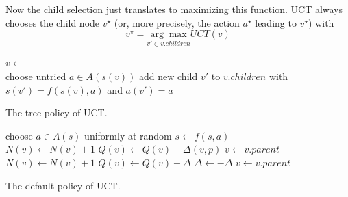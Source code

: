 Now the child selection just translates to maximizing this function. UCT always chooses the child node $v^\star$ (or, more precisely, the action $a^\star$ leading to $v^\star$) with
\begin{equation*}
    v^\star = \underset{v' \in v.children}{\arg \max} UCT(v)
\end{equation*}  
\begin{algorithm}[htbp]
\begin{algorithmic}
    \State {}
    \Else
    \State $v \gets$ 
    \EndIf
    \EndWhile
\EndFunction \\
\State choose untried $a \in A(s(v))$
\State add new child $v'$ to $v.children$ with $s(v') = f(s(v),a)$ and $a(v') = a$
\State {}
\EndFunction \\
\State {}
\EndFunction
\end{algorithmic}
\caption{The tree policy of UCT.}
\label{alg:uct_tree_policy}
\end{algorithm}
\begin{algorithm}[htbp]
\begin{algorithmic}
\State choose $a \in A(s)$ uniformly at random
\State $s \gets f(s,a)$
\EndWhile
\State {}
\EndFunction \\

 
\State $N(v) \gets N(v) + 1$
\State $Q(v) \gets Q(v) + \Delta(v,p)$
\State $v \gets v.parent$
\EndWhile
\State $N(v) \gets N(v) + 1$
\State $Q(v) \gets Q(v) + \Delta$
\State $\Delta \gets - \Delta$
\State $v \gets v.parent$
\EndFunction
\end{algorithmic}
\caption{The default policy of UCT.}
\label{alg:uct_default_policy}
\end{algorithm}


